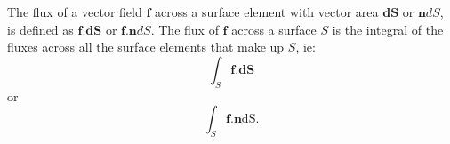 The flux of a vector field $\mathbf{f}$ across a surface element with vector area $\mathbf{dS}$ or $\mathbf{n}dS$, is defined as $\mathbf{f.dS}$ or $\mathbf{f.n}dS$. The flux of $\mathbf{f}$ across a surface $S$ is the integral of the fluxes across all the surface elements that make up $S$, ie: 
$$ \int_{S} \mathbf{f.dS} $$ or 
$$ \int_{S} \mathbf{f.n} \mathrm{dS}. $$
  
  
  